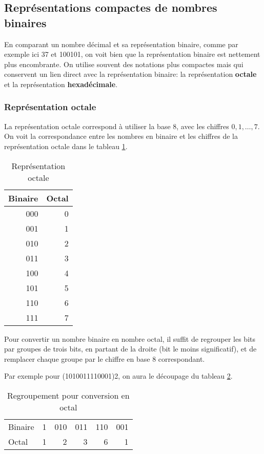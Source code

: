 \documentclass[11pt]{article}
\begin{document}
\subsection{Représentations compactes de nombres binaires}
\label{sec:org99a3c24}

En comparant un nombre décimal et sa représentation binaire, comme par
exemple ici 37 et 100101, on voit bien que la représentation binaire
est nettement plus encombrante. On utilise souvent des notations plus
compactes mais qui conservent un lien direct avec la représentation
binaire: la représentation \textbf{octale} et la représentation
\textbf{hexadécimale}.

\subsubsection{Représentation octale}
\label{sec:org0ec8df6}

La représentation octale correspond à utiliser la base 8, avec les
chiffres \(0, 1, \ldots, 7\). On voit la correspondance entre les
nombres en binaire et les chiffres de la représentation octale dans le
tableau \ref{tab:org38115b0}.

\begin{table}[htbp]
\caption{\label{tab:org38115b0}Représentation octale}
\centering
\begin{tabular}{rr}
Binaire & Octal\\
\hline
000 & 0\\
001 & 1\\
010 & 2\\
011 & 3\\
100 & 4\\
101 & 5\\
110 & 6\\
111 & 7\\
\end{tabular}
\end{table}

Pour convertir un nombre binaire en nombre octal, il suffit de
regrouper les bits par groupes de trois bits, en partant de la droite
(bit le moins significatif), et de remplacer chaque groupe par le
chiffre en base 8 correspondant.

Par exemple pour (1010011110001)2, on aura le découpage du tableau
\ref{tab:org738e7af}.

\begin{table}[htbp]
\caption{\label{tab:org738e7af}Regroupement pour conversion en octal}
\centering
\begin{tabular}{lrrrrr}
 &  &  &  &  & \\
\hline
Binaire & 1 & 010 & 011 & 110 & 001\\
Octal & 1 & 2 & 3 & 6 & 1\\
\end{tabular}
\end{table}
\end{document}
